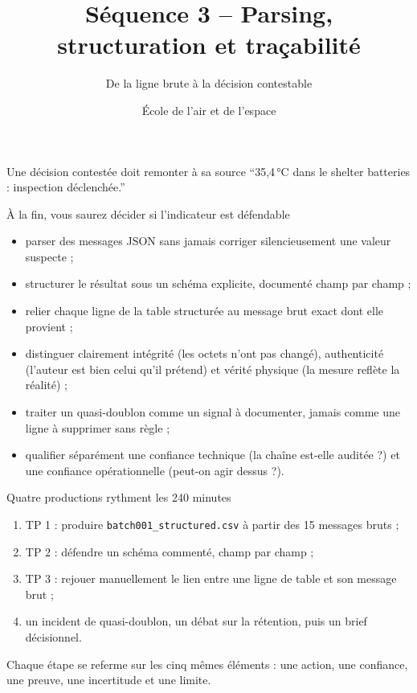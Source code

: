 \documentclass[aspectratio=169]{beamer}
\title{Séquence 3 -- Parsing, structuration et traçabilité}
\subtitle{De la ligne brute à la décision contestable}
\author{École de l'air et de l'espace}
\date{}
\begin{document}
\begin{frame}\titlepage\end{frame}

\begin{frame}{Une décision contestée doit remonter à sa source}
\large ``35,4\,°C dans le shelter batteries : inspection déclenchée.''
\end{frame}

\begin{frame}{À la fin, vous saurez décider si l'indicateur est défendable}
\begin{itemize}
\item parser des messages JSON sans jamais corriger silencieusement une valeur suspecte ;
\item structurer le résultat sous un schéma explicite, documenté champ par champ ;
\item relier chaque ligne de la table structurée au message brut exact dont elle provient ;
\item distinguer clairement intégrité (les octets n'ont pas changé), authenticité (l'auteur est bien celui qu'il prétend) et vérité physique (la mesure reflète la réalité) ;
\item traiter un quasi-doublon comme un signal à documenter, jamais comme une ligne à supprimer sans règle ;
\item qualifier séparément une confiance technique (la chaîne est-elle auditée ?) et une confiance opérationnelle (peut-on agir dessus ?).
\end{itemize}
\end{frame}

\begin{frame}{Quatre productions rythment les 240 minutes}
\begin{enumerate}
\item TP 1 : produire \texttt{batch001\_structured.csv} à partir des 15 messages bruts ;
\item TP 2 : défendre un schéma commenté, champ par champ ;
\item TP 3 : rejouer manuellement le lien entre une ligne de table et son message brut ;
\item un incident de quasi-doublon, un débat sur la rétention, puis un brief décisionnel.
\end{enumerate}
Chaque étape se referme sur les cinq mêmes éléments : une action, une confiance, une preuve, une incertitude et une limite.
\end{frame}
\end{document}
